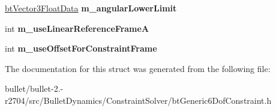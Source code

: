 \begin{DoxyCompactItemize}
\item 
\hypertarget{structbt_generic6_dof_constraint_data_ac2bc0498cdb28efdefef0898e943d504}{\hyperlink{structbt_vector3_float_data}{bt\+Vector3\+Float\+Data} {\bfseries m\+\_\+angular\+Lower\+Limit}}\label{structbt_generic6_dof_constraint_data_ac2bc0498cdb28efdefef0898e943d504}

\item 
\hypertarget{structbt_generic6_dof_constraint_data_a7261fd3530f55f13185ebb5a11bf0d85}{int {\bfseries m\+\_\+use\+Linear\+Reference\+Frame\+A}}\label{structbt_generic6_dof_constraint_data_a7261fd3530f55f13185ebb5a11bf0d85}

\item 
\hypertarget{structbt_generic6_dof_constraint_data_a995e6fd4f5e2f798bc265384757c81a1}{int {\bfseries m\+\_\+use\+Offset\+For\+Constraint\+Frame}}\label{structbt_generic6_dof_constraint_data_a995e6fd4f5e2f798bc265384757c81a1}

\end{DoxyCompactItemize}


The documentation for this struct was generated from the following file\+:\begin{DoxyCompactItemize}
\item 
bullet/bullet-\/2.-\/r2704/src/\+Bullet\+Dynamics/\+Constraint\+Solver/bt\+Generic6\+Dof\+Constraint.\+h\end{DoxyCompactItemize}

